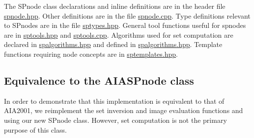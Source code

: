 \-The \-S\-Pnode class declarations and inline definitions are in the header file \hyperlink{spnode_8hpp}{spnode.\-hpp}. \-Other definitions are in the file \hyperlink{spnode_8cpp}{spnode.\-cpp}. \-Type definitions relevant to \-S\-Pnodes are in the file \hyperlink{sptypes_8hpp}{sptypes.\-hpp}. \-General tool functions useful for spnodes are in \hyperlink{sptools_8hpp}{sptools.\-hpp} and \hyperlink{sptools_8cpp}{sptools.\-cpp}. \-Algorithms used for set computation are declared in \hyperlink{spalgorithms_8hpp}{spalgorithms.\-hpp} and defined in \hyperlink{spalgorithms_8hpp}{spalgorithms.\-hpp}. \-Template functions requiring node concepts are in \hyperlink{sptemplates_8hpp}{sptemplates.\-hpp}.



\hypertarget{newsubpavings_newsec_equivalence}{}\subsection{\-Equivalence to the A\-I\-A\-S\-Pnode class}\label{newsubpavings_newsec_equivalence}
\-In order to demonstrate that this implementation is equivalent to that of \-A\-I\-A2001, we reimplement the set inversion and image evaluation functions and using our new \-S\-Pnode class. \-However, set computation is not the primary purpose of this class.

